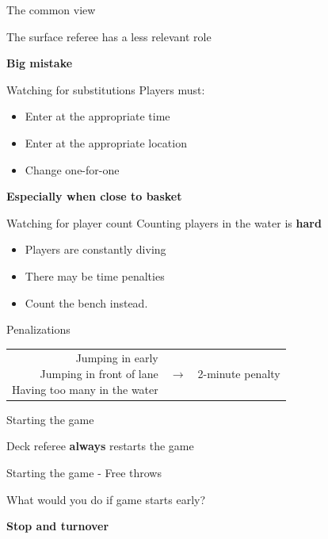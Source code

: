 \documentclass{beamer}
\begin{document}
	\begin{frame}{The common view}
		\begin{center}
		The surface referee has a less relevant role \pause

		\textbf{Big mistake}
		\end{center}
	\end{frame}

	\begin{frame}{Watching for substitutions}
		Players must:
		\begin{itemize}
			\item Enter at the appropriate time
			\item Enter at the appropriate location
			\item Change one-for-one
		\end{itemize}

		\pause

		\textbf{Especially when close to basket}
	\end{frame}

	\begin{frame}{Watching for player count}
		Counting players in the water is \textbf{hard}
		\begin{itemize}
			\item Players are constantly diving
			\item There may be time penalties

			\pause

			\item Count the bench instead.
		\end{itemize}
	\end{frame}

	\begin{frame}{Penalizations}
		\begin{tabular}{rcl}
			\parbox{0.45\textwidth}
			{
				Jumping in early \\
				Jumping in front of lane \\
				Having too many in the water
			}
			&
			$\rightarrow$
			&
			2-minute penalty
		\end{tabular}
	\end{frame}

	\begin{frame}{Starting the game}
		\begin{center}
			Deck referee \textbf{always} restarts the game
		\end{center}
	\end{frame}

	\begin{frame}{Starting the game - Free throws}
		\begin{center}
			What would you do if game starts early? \pause

			\textbf{Stop and turnover}
		\end{center}
	\end{frame}
\end{document}
